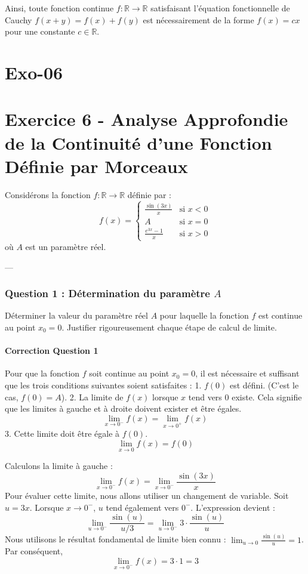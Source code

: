 \documentclass[12pt,a4paper]{report}
\begin{document}
    Ainsi, toute fonction continue $f: \mathbb{R} \to \mathbb{R}$ satisfaisant l'équation fonctionnelle de Cauchy $f(x+y) = f(x) + f(y)$ est nécessairement de la forme $f(x) = cx$ pour une constante $c \in \mathbb{R}$.

\section{Exo-06}
\section{Exercice 6 - Analyse Approfondie de la Continuité d'une Fonction Définie par Morceaux}

Considérons la fonction $f: \mathbb{R} \to \mathbb{R}$ définie par :
$$ f(x) = \begin{cases} \frac{\sin(3x)}{x} & \text{si } x < 0 \\ A & \text{si } x = 0 \\ \frac{e^{3x} - 1}{x} & \text{si } x > 0 \end{cases} $$
où $A$ est un paramètre réel.

---

\subsubsection{Question 1 : Détermination du paramètre $A$}

Déterminer la valeur du paramètre réel $A$ pour laquelle la fonction $f$ est continue au point $x_0 = 0$. Justifier rigoureusement chaque étape de calcul de limite.

\paragraph{Correction Question 1}

Pour que la fonction $f$ soit continue au point $x_0 = 0$, il est nécessaire et suffisant que les trois conditions suivantes soient satisfaites :
1.  $f(0)$ est défini. (C'est le cas, $f(0) = A$).
2.  La limite de $f(x)$ lorsque $x$ tend vers $0$ existe. Cela signifie que les limites à gauche et à droite doivent exister et être égales.
    $$ \lim_{x \to 0^-} f(x) = \lim_{x \to 0^+} f(x) $$
3.  Cette limite doit être égale à $f(0)$.
    $$ \lim_{x \to 0} f(x) = f(0) $$

Calculons la limite à gauche :
$$ \lim_{x \to 0^-} f(x) = \lim_{x \to 0^-} \frac{\sin(3x)}{x} $$
Pour évaluer cette limite, nous allons utiliser un changement de variable.
Soit $u = 3x$. Lorsque $x \to 0^-$, $u$ tend également vers $0^-$.
L'expression devient :
$$ \lim_{u \to 0^-} \frac{\sin(u)}{u/3} = \lim_{u \to 0^-} 3 \cdot \frac{\sin(u)}{u} $$
Nous utilisons le résultat fondamental de limite bien connu : $\lim_{u \to 0} \frac{\sin(u)}{u} = 1$.
Par conséquent,
$$ \lim_{x \to 0^-} f(x) = 3 \cdot 1 = 3 $$
\end{document}
